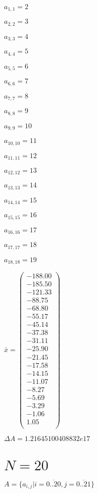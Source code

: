 \documentclass[a4paper,12pt]{article}
\begin{document}
$a _{ 1, 1 } = 2$

$a _{ 2, 2 } = 3$

$a _{ 3, 3 } = 4$

$a _{ 4, 4 } = 5$

$a _{ 5, 5 } = 6$

$a _{ 6, 6 } = 7$

$a _{ 7, 7 } = 8$

$a _{ 8, 8 } = 9$

$a _{ 9, 9 } = 10$

$a _{ 10, 10 } = 11$

$a _{ 11, 11 } = 12$

$a _{ 12, 12 } = 13$

$a _{ 13, 13 } = 14$

$a _{ 14, 14 } = 15$

$a _{ 15, 15 } = 16$

$a _{ 16, 16 } = 17$

$a _{ 17, 17 } = 18$

$a _{ 18, 18 } = 19$

$\bar { x } = \begin{pmatrix}
-188.00 \\
-185.50 \\
-121.33 \\
-88.75 \\
-68.80 \\
-55.17 \\
-45.14 \\
-37.38 \\
-31.11 \\
-25.90 \\
-21.45 \\
-17.58 \\
-14.15 \\
-11.07 \\
-8.27 \\
-5.69 \\
-3.29 \\
-1.06 \\
1.05 \\
\end{pmatrix}
$

$\Delta A = 1.21645100408832e17$



\section{ $N = 20$ }
$A = \{ a _{ i, j } | i = \overline { 0..20 }, j = \overline { 0..21 } \}$
\end{document}
